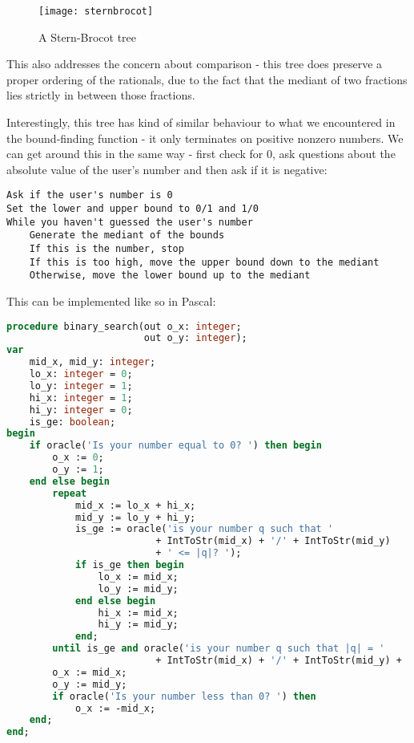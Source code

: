 \documentclass[fleqn,a4paper,11pt]{article}
\begin{document}
    \begin{figure}[h]
        \texttt{[image: sternbrocot]}
        \centering
        \caption{A Stern-Brocot tree}
    \end{figure}

    This also addresses the concern about comparison - this tree does preserve a
    proper ordering of the rationals, due to the fact that the mediant of two
    fractions lies strictly in between those fractions.

    Interestingly, this tree has kind of similar behaviour to what we
    encountered in the bound-finding function - it only terminates on positive
    nonzero numbers. We can get around this in the same way - first check for 0,
    ask questions about the absolute value of the user's number and then ask if
    it is negative:

\begin{lstlisting}[caption=Binary search on \(\mathbb{Q}\) in pseudocode]
Ask if the user's number is 0
Set the lower and upper bound to 0/1 and 1/0
While you haven't guessed the user's number
    Generate the mediant of the bounds
    If this is the number, stop
    If this is too high, move the upper bound down to the mediant
    Otherwise, move the lower bound up to the mediant
\end{lstlisting}

    This can be implemented like so in Pascal:

\begin{lstlisting}[language=Pascal, caption=Binary search on \(\mathbb{Q}\) in Pascal]
procedure binary_search(out o_x: integer;
                        out o_y: integer);
var
    mid_x, mid_y: integer;
    lo_x: integer = 0;
    lo_y: integer = 1;
    hi_x: integer = 1;
    hi_y: integer = 0;
    is_ge: boolean;
begin
    if oracle('Is your number equal to 0? ') then begin
        o_x := 0;
        o_y := 1;
    end else begin
        repeat
            mid_x := lo_x + hi_x;
            mid_y := lo_y + hi_y;
            is_ge := oracle('is your number q such that '
                          + IntToStr(mid_x) + '/' + IntToStr(mid_y)
                          + ' <= |q|? ');
            if is_ge then begin
                lo_x := mid_x;
                lo_y := mid_y;
            end else begin
                hi_x := mid_x;
                hi_y := mid_y;
            end;
        until is_ge and oracle('is your number q such that |q| = '
                          + IntToStr(mid_x) + '/' + IntToStr(mid_y) + '? ');
        o_x := mid_x;
        o_y := mid_y;
        if oracle('Is your number less than 0? ') then
            o_x := -mid_x;
    end;
end;
\end{lstlisting}
\end{document}
